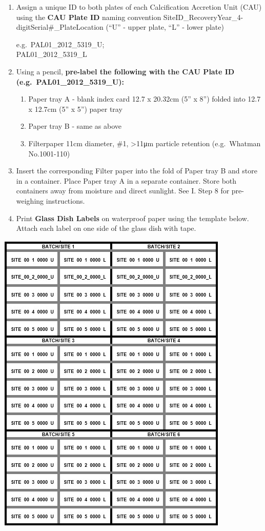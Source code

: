\documentclass[]{book}
\providecommand{\tightlist}{%
  \setlength{\itemsep}{0pt}\setlength{\parskip}{0pt}}
\begin{document}
\begin{enumerate}
\def\labelenumi{\arabic{enumi}.}
\item
  Assign a unique ID to both plates of each Calcification Accretion Unit (CAU) using the \textbf{CAU Plate ID} naming convention SiteID\_RecoveryYear\_4-digitSerial\#\_PlateLocation (``U'' - upper plate, ``L'' - lower plate)

  e.g.~PAL01\_2012\_5319\_U;\\
  PAL01\_2012\_5319\_L
\item
  Using a pencil, \textbf{pre-label the following with the CAU Plate ID (e.g.~PAL01\_2012\_5319\_U):}

  \begin{enumerate}
  \def\labelenumii{\alph{enumii}.}
  \tightlist
  \item
    Paper tray A - blank index card 12.7 x 20.32cm (5'' x 8'') folded into 12.7 x 12.7cm (5'' x 5'') paper tray\\
  \item
    Paper tray B - same as above\\
  \item
    Filterpaper 11cm diameter, \#1, \textgreater11μm particle retention (e.g.~Whatman No.1001-110)
  \end{enumerate}
\item
  Insert the corresponding Filter paper into the fold of Paper tray B and store in a container. Place Paper tray A in a separate container. Store both containers away from moisture and direct sunlight. See I. Step 8 for pre-weighing instructions.
\item
  Print \textbf{Glass Dish Labels} on waterproof paper using the template below. Attach each label on one side of the glass dish with tape.
\end{enumerate}

\includegraphics{images/Template1.jpg}
\end{document}
